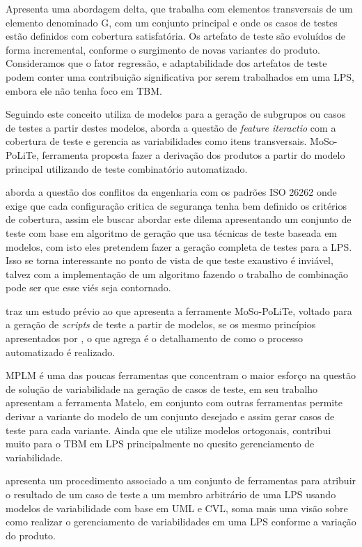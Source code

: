 \cite{lity2012delta} Apresenta uma abordagem delta, que trabalha com elementos transversais de um elemento denominado G, com um conjunto principal e onde os casos de testes estão definidos com cobertura satisfatória. Os artefato de teste são evoluídos de forma incremental, conforme o surgimento de novas variantes do produto. Consideramos que o fator regressão, e adaptabilidade dos artefatos de teste podem conter uma contribuição significativa por serem trabalhados em uma LPS, embora ele não tenha foco em TBM.

Seguindo este conceito \cite{steffens2012industrial} utiliza de modelos para a geração de subgrupos ou casos de testes a partir destes modelos, aborda a questão de \textit{feature iteractio} com a cobertura de teste e gerencia as variabilidades como itens transversais. MoSo-PoLiTe, ferramenta proposta fazer a derivação dos produtos a partir do modelo principal utilizando de teste combinatório automatizado.

\cite{cichos2011model} aborda a questão dos conflitos da engenharia com os padrões ISO 26262 onde exige que cada configuração critica de segurança tenha bem definido os critérios de cobertura, assim ele buscar abordar este dilema apresentando um conjunto de teste com base em algoritmo de geração que usa técnicas de teste baseada em modelos, com isto eles pretendem fazer a geração completa de testes para a LPS. Isso se torna interessante no ponto de vista de que teste exaustivo é inviável, talvez com a implementação de um algoritmo fazendo o trabalho de combinação pode ser que esse viés seja contornado.

\cite{oster2011moso} traz um estudo prévio ao \cite{steffens2012industrial} que apresenta a ferramente MoSo-PoLiTe, voltado para a geração de \textit{scripts} de teste a partir de modelos, se os mesmo princípios apresentados por \cite{steffens2012industrial}, o que agrega é o detalhamento de como o processo automatizado é realizado.

MPLM é uma das poucas ferramentas que concentram o maior esforço na questão de solução de variabilidade na geração de casos de teste, \cite{samih2014mplm} em seu trabalho apresentam a ferramenta Matelo, em conjunto com outras ferramentas permite derivar a variante do modelo de um conjunto desejado e assim gerar casos de teste para cada variante.
Ainda que ele utilize modelos ortogonais, contribui muito para o TBM em LPS principalmente no quesito gerenciamento de variabilidade.

\cite{knapp2014use} apresenta um procedimento associado a um conjunto de ferramentas para atribuir o resultado de um caso de teste a um membro arbitrário de uma LPS usando modelos de variabilidade com base em UML e CVL, soma mais uma visão sobre como realizar o gerenciamento de variabilidades em uma LPS conforme a variação do produto.

